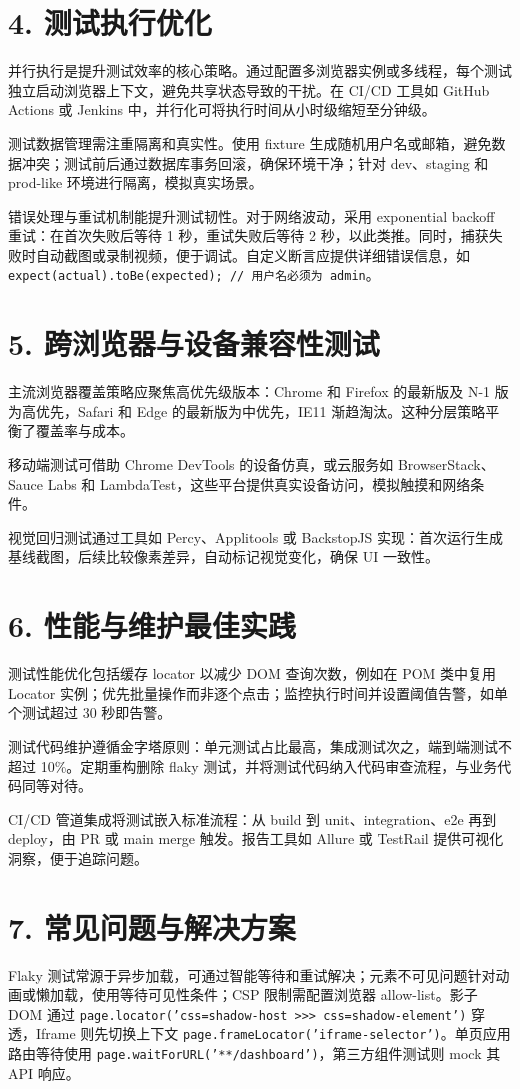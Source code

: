 \chapter{4. 测试执行优化}
并行执行是提升测试效率的核心策略。通过配置多浏览器实例或多线程，每个测试独立启动浏览器上下文，避免共享状态导致的干扰。在 CI/CD 工具如 GitHub Actions 或 Jenkins 中，并行化可将执行时间从小时级缩短至分钟级。\par
测试数据管理需注重隔离和真实性。使用 fixture 生成随机用户名或邮箱，避免数据冲突；测试前后通过数据库事务回滚，确保环境干净；针对 dev、staging 和 prod-like 环境进行隔离，模拟真实场景。\par
错误处理与重试机制能提升测试韧性。对于网络波动，采用 exponential backoff 重试：在首次失败后等待 1 秒，重试失败后等待 2 秒，以此类推。同时，捕获失败时自动截图或录制视频，便于调试。自定义断言应提供详细错误信息，如 \texttt{expect(actual).toBe(expected); // 用户名必须为 admin}。\par
\chapter{5. 跨浏览器与设备兼容性测试}
主流浏览器覆盖策略应聚焦高优先级版本：Chrome 和 Firefox 的最新版及 N-1 版为高优先，Safari 和 Edge 的最新版为中优先，IE11 渐趋淘汰。这种分层策略平衡了覆盖率与成本。\par
移动端测试可借助 Chrome DevTools 的设备仿真，或云服务如 BrowserStack、Sauce Labs 和 LambdaTest，这些平台提供真实设备访问，模拟触摸和网络条件。\par
视觉回归测试通过工具如 Percy、Applitools 或 BackstopJS 实现：首次运行生成基线截图，后续比较像素差异，自动标记视觉变化，确保 UI 一致性。\par
\chapter{6. 性能与维护最佳实践}
测试性能优化包括缓存 locator 以减少 DOM 查询次数，例如在 POM 类中复用 Locator 实例；优先批量操作而非逐个点击；监控执行时间并设置阈值告警，如单个测试超过 30 秒即告警。\par
测试代码维护遵循金字塔原则：单元测试占比最高，集成测试次之，端到端测试不超过 10\%{}。定期重构删除 flaky 测试，并将测试代码纳入代码审查流程，与业务代码同等对待。\par
CI/CD 管道集成将测试嵌入标准流程：从 build 到 unit、integration、e2e 再到 deploy，由 PR 或 main merge 触发。报告工具如 Allure 或 TestRail 提供可视化洞察，便于追踪问题。\par
\chapter{7. 常见问题与解决方案}
Flaky 测试常源于异步加载，可通过智能等待和重试解决；元素不可见问题针对动画或懒加载，使用等待可见性条件；CSP 限制需配置浏览器 allow-list。影子 DOM 通过 \texttt{page.locator('css=shadow-host >>> css=shadow-element')} 穿透，Iframe 则先切换上下文 \texttt{page.frameLocator('iframe-selector')}。单页应用路由等待使用 \texttt{page.waitForURL('**/dashboard')}，第三方组件测试则 mock 其 API 响应。\par
